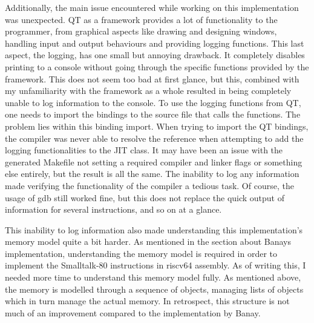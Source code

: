Additionally, the main issue encountered while working on this implementation was unexpected. QT as a framework provides a lot of functionality to the programmer, from graphical aspects like drawing and designing windows, handling input and output behaviours and providing logging functions. This last aspect, the logging, has one small but annoying drawback. It completely disables printing to a console without going through the specific functions provided by the framework. This does not seem too bad at first glance, but this, combined with my unfamiliarity with the framework as a whole resulted in being completely unable to log information to the console. To use the logging functions from QT, one needs to import the bindings to the source file that calls the functions. The problem lies within this binding import. When trying to import the QT bindings, the compiler was never able to resolve the reference when attempting to add the logging functionalities to the JIT class. It may have been an issue with the generated Makefile not setting a required compiler and linker flags or something else entirely, but the result is all the same. The inability to log any information made verifying the functionality of the \jit{} compiler a tedious task. Of course, the usage of gdb still worked fine, but this does not replace the quick output of information for several instructions, \bbs{} and so on at a glance. 

This inability to log information also made understanding this implementation's memory model quite a bit harder.
As mentioned in the section about Banays implementation, understanding the memory model is required in order to implement the Smalltalk-80 instructions in riscv64 assembly.
As of writing this, I needed more time to understand this memory model fully. 
As mentioned above, the memory is modelled through a sequence of objects, managing lists of objects which in turn manage the actual memory.
In retrospect, this structure is not much of an improvement compared to the implementation by Banay.
